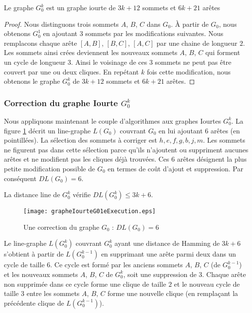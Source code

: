 \begin{theorem}
Le graphe $G_0^k$ est un graphe iourte de $3k+12$ sommets et $6k + 21$ ar\^etes
\end{theorem} 

\begin{proof}
Nous distinguons trois sommets $A$, $B$, $C$ dans $G_0$. 
\`A partir de $G_0$, nous obtenons $G_0^1$ en ajoutant $3$ sommets par les modifications  suivantes.
Nous remplacons chaque ar\^ete $[A,B]$, $[B,C]$,  $[A,C]$  par une chaine de longueur $2$. 
Les sommets ainsi cr\'ees deviennent les nouveaux sommets   $A$, $B$, $C$ qui forment un cycle de longueur $3$.
Ainsi le voisinage de ces $3$ sommets  ne peut pas \^etre couvert par une ou deux cliques.
En rep\'etant $k$ fois cette modification, nous obtenons le graphe $G_0^k$ de $3k+12$ sommets et $6k+21$ ar\^etes.
\end{proof}

\subsubsection{Correction du graphe Iourte  $G_0^k$}
Nous appliquons maintenant le couple d'algorithmes aux graphes Iourtes $G_0^k$.
La figure \ref{grapheIourteG01eExecution} d\'ecrit un line-graphe $L(G_0)$ couvrant $G_0$ en lui ajoutant $6$ ar\^etes (en pointill\'ees).
La s\'election des sommets \`a corriger est $h, e, f, g, b, j, m$. 
Les sommets ne figurent pas dans cette s\'election parce qu'ils n'ajoutent ou suppriment aucunes ar\^etes et ne modifient pas les cliques d\'ej\`a trouv\'ees.
Ces $6$ ar\^etes d\'esignent la plus petite modification possible de $G_0$ en termes de co\^ut d'ajout et suppression.
Par cons\'equent $DL(G_0) = 6$. 
\begin{conjecture}
\label{conjectureDLIourte}
La distance line de $G_0^k$ v\'erifie $DL(G_0^k) \le 3k+6$.
\end{conjecture}
\begin{figure}[htb!] 
\centering
\texttt{[image: grapheIourteG01eExecution.eps]}
\caption{Une correction du graphe $G_0$ : $DL(G_0) = 6$ }
\label{grapheIourteG01eExecution} 
\end{figure}
Le line-graphe  $L(G_0^k)$ couvrant $G_0^k$ ayant une distance de Hamming de $3k+6$ s'obtient \`a partir de  $L(G_0^{k-1})$ en supprimant une ar\^ete parmi deux dans un cycle de taille $6$. Ce cycle est form\'e par les anciens sommets $A$, $B$, $C$ (de $G_0^{k-1}$) et les nouveaux sommets $A$, $B$, $C$ de $G_0^k$, soit une suppression de $3$.
Chaque ar\^ete non supprim\'ee dans ce cycle forme une clique de taille $2$ et  le nouveau cycle de taille $3$ entre les sommets $A$, $B$, $C$ forme une nouvelle clique (en rempla\c cant la pr\'ec\'edente clique de $L(G_0^{k-1})$).